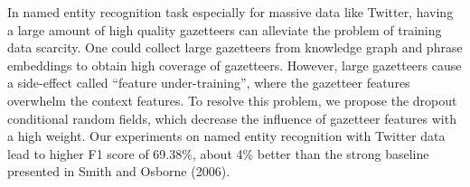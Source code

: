 In named entity recognition task especially for massive data like Twitter, having a large amount of high quality gazetteers can alleviate the problem of training data scarcity. One could collect large gazetteers from knowledge graph and phrase embeddings to obtain high coverage of gazetteers. However, large gazetteers cause a side-effect called ``feature under-training'', where the gazetteer features overwhelm the context features. To resolve this problem, we propose the dropout conditional random fields, which decrease the influence of gazetteer features with a high weight. Our experiments on named entity recognition with Twitter data lead to higher F1 score of 69.38\%, about 4\% better than the strong baseline presented in Smith and Osborne (2006).
